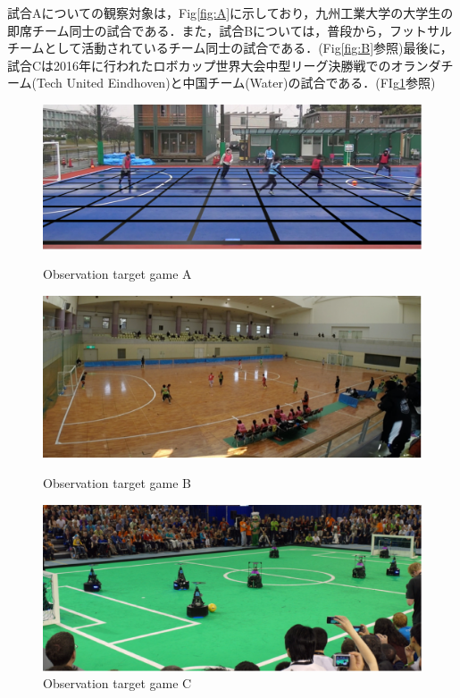 試合Aについての観察対象は，Fig\ref{fig:A}に示しており，九州工業大学の大学生の即席チーム同士の試合である．また，試合Bについては，普段から，フットサルチームとして活動されているチーム同士の試合である．(Fig\ref{fig:B}参照)最後に，試合Cは2016年に行われたロボカップ世界大会中型リーグ決勝戦でのオランダチーム(Tech United Eindhoven)と中国チーム(Water)の試合である．(FIg\ref{fig:C}参照)

\clearpage %

\begin{figure}[ht]
  \begin{center}
  
    \includegraphics[clip,width=15.0cm]{figure/Observation_target_game_A.eps}
    \caption{Observation target game A}
    \label{fig:A}
    
    \includegraphics[width=15.0cm]{figure/Observation_target_game_B.eps}
    \caption{Observation target game B}
    \label{fig:B}
    
    \includegraphics[width=15.0cm]{figure/Observation_target_game_C.eps}
    \caption{Observation target game C}
    \label{fig:C}
    
  \end{center}
\end{figure}

